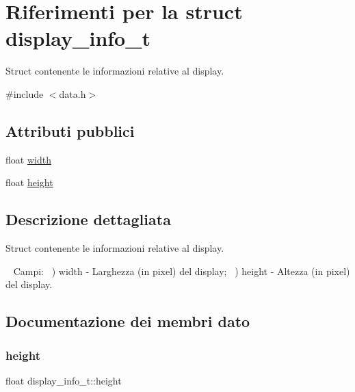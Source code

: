 \hypertarget{structdisplay__info__t}{}\section{Riferimenti per la struct display\+\_\+info\+\_\+t}
\label{structdisplay__info__t}


Struct contenente le informazioni relative al display.  




{\ttfamily \#include $<$data.\+h$>$}

\subsection*{Attributi pubblici}
\begin{DoxyCompactItemize}
\item 
float \hyperlink{structdisplay__info__t_a3583ae6a4244e807984627a844f6c68e}{width}
\item 
float \hyperlink{structdisplay__info__t_aa5a1ab68cd7a7e3e0b4bf130c44b4677}{height}
\end{DoxyCompactItemize}


\subsection{Descrizione dettagliata}
Struct contenente le informazioni relative al display. 

~\newline
Campi\+: ~) width -\/ Larghezza (in pixel) del display; ~) height -\/ Altezza (in pixel) del display. 

\subsection{Documentazione dei membri dato}
\mbox{\label{structdisplay__info__t_aa5a1ab68cd7a7e3e0b4bf130c44b4677}} 
\subsubsection{\texorpdfstring{height}{height}}
{\footnotesize\ttfamily float display\+\_\+info\+\_\+t\+::height}


